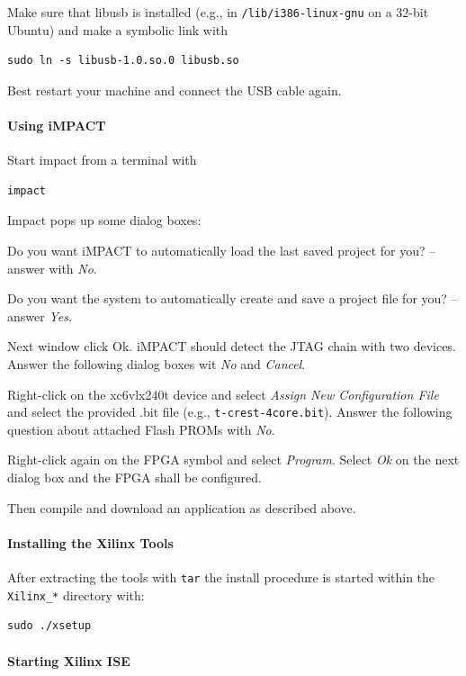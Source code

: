\documentclass[a4paper,fontsize=10pt,twoside,DIV15,BCOR12mm,headinclude=true,footinclude=false,pagesize,bibtotoc]{scrbook}
\newcommand{\code}[1]{{\texttt{#1}}}
\begin{document}
Make sure that libusb is installed (e.g., in \code{/lib/i386-linux-gnu} on a 32-bit Ubuntu) and make a symbolic link with

\begin{verbatim} 
sudo ln -s libusb-1.0.so.0 libusb.so
\end{verbatim}

Best restart your machine and connect the USB cable again.

\paragraph{Using iMPACT}

Start impact from a terminal with 

\begin{verbatim} 
impact
\end{verbatim}

Impact pops up some dialog boxes:

Do you want iMPACT to automatically load the last saved project for you? -- answer with \emph{No}.

Do you want the system to automatically create and save a project file for you? -- answer \emph{Yes}.

Next window click Ok. iMPACT should detect the JTAG chain with two devices. Answer the
following dialog boxes wit \emph{No} and \emph{Cancel}.

Right-click on the xc6vlx240t device and select \emph{Assign New Configuration File} and select
the provided .bit file (e.g., \code{t-crest-4core.bit}). Answer the following question about attached
Flash PROMs with \emph{No}.

Right-click again on the FPGA symbol and select \emph{Program}. Select \emph{Ok} on the next
dialog box and the FPGA shall be configured.

Then compile and download an application as described above.

\paragraph{Installing the Xilinx Tools}

After extracting the tools with \code{tar} the install procedure is started within the
\code{Xilinx\_*} directory with:

\begin{verbatim}
sudo ./xsetup
\end{verbatim}

\paragraph{Starting Xilinx ISE}
\end{document}
